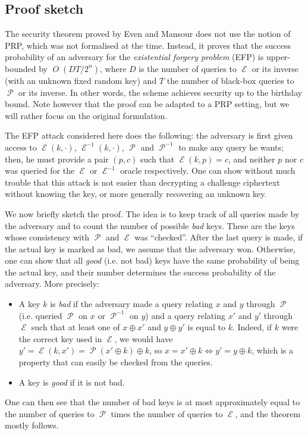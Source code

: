 \documentclass[11pt,a4paper]{article}
\theoremstyle{definition}
\DeclareMathOperator\E{\mathcal{E}}
\DeclareMathOperator\Perm{\mathcal{P}}
\DeclareMathOperator\bigo{\mathit{O}}
\begin{document}
\subsection{Proof sketch}

The security theorem proved by Even and Mansour does not use the notion of PRP, which was not formalised at the time. Instead,
it proves that the success probability of an adversary for the \emph{existential forgery problem} (EFP) is upper-bounded by
$\bigo(DT/2^n)$, where $D$ is the number of queries to $\E$ or its inverse (with an unknown fixed random key) and $T$
the number of black-box queries to $\Perm$ or its inverse. In other words, the scheme achieves security up to the birthday bound.
Note however that the proof can be adapted to a PRP setting, but we will rather focus on the original formulation.

The EFP attack considered here does the following: the adversary is first given access to $\E(k, \cdot)$, $\E^{-1}(k, \cdot)$, $\Perm$ and $\Perm^{-1}$
to make any query he wants;
then, he must provide a pair $(p, c)$ such that $\E(k,p) = c$, and neither $p$ nor $c$ was queried for the $\E$ or $\E^{-1}$ oracle respectively.
One can show without much trouble that this attack is not easier than decrypting a challenge ciphertext without knowing the key, or more generally recovering an unknown key.

We now briefly sketch the proof. The idea is to keep track of all queries made by the adversary and to count the number of possible \emph{bad} keys. These are the keys
whose consistency with $\Perm$ and $\E$ was ``checked''. After the last query is made, if the actual key is marked as bad, we assume that the adversary
won. Otherwise, one can show that all \emph{good} (i.e. not bad) keys have the same probability of being the actual key, and their number determines the
success probability of the adversary.
More precisely:
\begin{itemize}
\item A key $k$ is \emph{bad} if the adversary made a query relating $x$ and $y$ through $\Perm$ (i.e. queried $\Perm$ on $x$ or $\Perm^{-1}$ on $y$)
and a query relating $x'$ and $y'$ through $\E$ such that at least one of $x \oplus x'$ and $y \oplus y'$ is equal to $k$.
Indeed, if $k$ were the correct key used in $\E$, we would have $y' = \E(k,x') = \Perm(x' \oplus k) \oplus k$, so $x = x' \oplus k \Leftrightarrow y' = y \oplus k$,
which is a property that can easily be checked from the queries.
\item A key is \emph{good} if it is not bad.
\end{itemize}
One can then see that the number of bad keys is at most approximately equal to the number of queries to $\Perm$ times the number of queries to $\E$,
and the theorem mostly follows.
\end{document}
